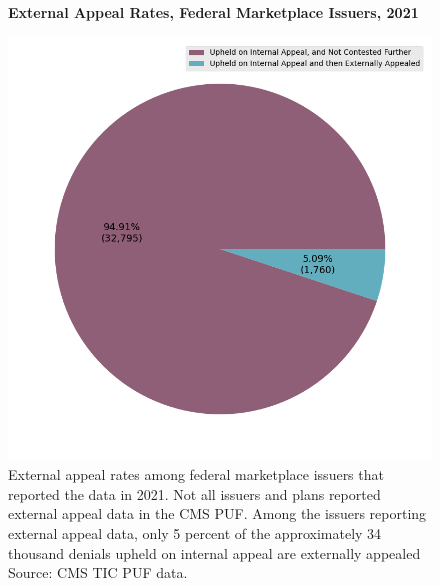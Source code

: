 \documentclass[12pt, a4paper]{report}
\begin{document}
\begin{figure}
	\centering
	\textbf{External Appeal Rates, Federal Marketplace Issuers, 2021}\par\medskip
	\includegraphics[width=0.85\columnwidth]{images/cms_puf/external_appeal_rates_all_insurers.png}
	\caption{External appeal rates among federal marketplace issuers that reported the data in 2021. Not all issuers and plans reported external appeal data in the CMS PUF. Among the issuers reporting external appeal data, only 5 percent of the approximately 34 thousand denials upheld on internal appeal are externally appealed Source: CMS TIC PUF data.}
	\label{federal_external_appeal_rates}
\end{figure}
\end{document}
